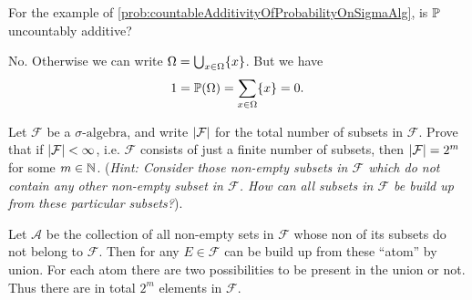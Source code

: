 \begin{problem}
	For the example of \autoref{prob:countableAdditivityOfProbabilityOnSigmaAlg}, is $ \mathbb{P} $ uncountably additive?
\end{problem}
\begin{solution}
	No. Otherwise we can write $ \Omega = \bigcup_{x\in\Omega}\{x\} $. But we have
	\[ 1 = \mathbb{P}(\Omega) = \sum_{x\in\Omega}\{x\} = 0. \]
\end{solution}

\begin{problem}
	Let $ \mathcal{F} $ be a $\sigma\text{-algebra}$, and write $ |\mathcal{F}| $ for the total number of subsets in $ \mathcal{F} $. Prove that if $ |\mathcal{F}|<\infty $, i.e. $ \mathcal{F} $  consists of just a finite number of subsets, then $ |\mathcal{F}|=2^m $ for some $ m \in \mathbb{N} $. (\emph{Hint: Consider those non-empty subsets in $ \mathcal{F} $ which do not contain any other non-empty subset in $ \mathcal{F} $. How can all subsets in $ \mathcal{F} $ be build up from these particular subsets?}).
\end{problem}
\begin{solution}
	Let $ \mathcal{A} $ be the collection of all non-empty sets in $ \mathcal{F} $ whose non of its subsets do not belong to $ \mathcal{F} $. Then for any $ E \in \mathcal{F} $ can be build up from these ``atom'' by union. For each atom there are two possibilities to be present in the union or not. Thus there are in total $ 2^m $ elements in $ \mathcal{F} $.
\end{solution}


